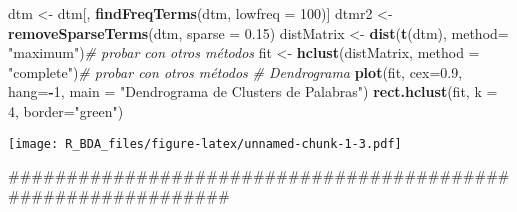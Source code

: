 \documentclass[]{article}
\newenvironment{Shaded}{\begin{snugshade}}{\end{snugshade}}
\newcommand{\KeywordTok}[1]{\textcolor[rgb]{0.13,0.29,0.53}{\textbf{#1}}}
\newcommand{\DataTypeTok}[1]{\textcolor[rgb]{0.13,0.29,0.53}{#1}}
\newcommand{\DecValTok}[1]{\textcolor[rgb]{0.00,0.00,0.81}{#1}}
\newcommand{\FloatTok}[1]{\textcolor[rgb]{0.00,0.00,0.81}{#1}}
\newcommand{\StringTok}[1]{\textcolor[rgb]{0.31,0.60,0.02}{#1}}
\newcommand{\CommentTok}[1]{\textcolor[rgb]{0.56,0.35,0.01}{\textit{#1}}}
\newcommand{\OperatorTok}[1]{\textcolor[rgb]{0.81,0.36,0.00}{\textbf{#1}}}
\newcommand{\NormalTok}[1]{#1}
\begin{document}
\begin{Shaded}
\begin{Highlighting}[]
\NormalTok{dtm <-}\StringTok{ }\NormalTok{dtm[, }\KeywordTok{findFreqTerms}\NormalTok{(dtm, }\DataTypeTok{lowfreq =} \DecValTok{100}\NormalTok{)]}
\NormalTok{dtmr2 <-}\StringTok{ }\KeywordTok{removeSparseTerms}\NormalTok{(dtm, }\DataTypeTok{sparse =} \FloatTok{0.15}\NormalTok{)}
\NormalTok{distMatrix <-}\StringTok{ }\KeywordTok{dist}\NormalTok{(}\KeywordTok{t}\NormalTok{(dtm), }\DataTypeTok{method=} \StringTok{"maximum"}\NormalTok{)}\CommentTok{# probar con otros métodos}
\NormalTok{fit <-}\StringTok{ }\KeywordTok{hclust}\NormalTok{(distMatrix, }\DataTypeTok{method =} \StringTok{"complete"}\NormalTok{)}\CommentTok{# probar con otros métodos}
\CommentTok{# Dendrograma}
\KeywordTok{plot}\NormalTok{(fit, }\DataTypeTok{cex=}\FloatTok{0.9}\NormalTok{, }\DataTypeTok{hang=}\OperatorTok{-}\DecValTok{1}\NormalTok{, }\DataTypeTok{main =} \StringTok{"Dendrograma de Clusters de Palabras"}\NormalTok{)}
\KeywordTok{rect.hclust}\NormalTok{(fit, }\DataTypeTok{k =} \DecValTok{4}\NormalTok{, }\DataTypeTok{border=}\StringTok{"green"}\NormalTok{) }
\end{Highlighting}
\end{Shaded}

\texttt{[image: R\_BDA\_files/figure-latex/unnamed-chunk-1-3.pdf]}

\begin{Shaded}
\begin{Highlighting}[]
\NormalTok{##############################################################}
\end{Highlighting}
\end{Shaded}
\end{document}
